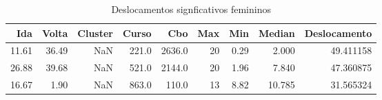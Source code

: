 \begin{table}
\centering
\caption{Deslocamentos signficativos femininos}
\label{tab:Salarios_Desequlibrio_F}
\begin{tabular}{rrrrrrrrr}
\toprule
  Ida &  Volta &  Cluster &  Curso &    Cbo &  Max &  Min &  Median &  Deslocamento \\
\midrule
11.61 &  36.49 &      NaN &  221.0 & 2636.0 &   20 & 0.29 &   2.000 &     49.411158 \\
26.88 &  39.68 &      NaN &  521.0 & 2144.0 &   20 & 1.96 &   7.840 &     47.360875 \\
16.67 &   1.90 &      NaN &  863.0 &  110.0 &   13 & 8.82 &  10.785 &     31.565324 \\
\bottomrule
\end{tabular}
\end{table}
